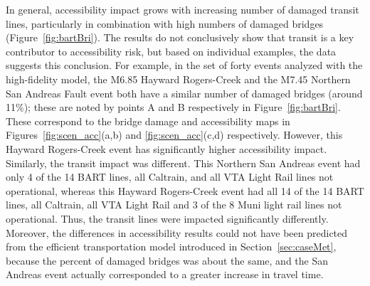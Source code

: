 In general, accessibility impact grows with increasing number of damaged transit lines, particularly in combination with high numbers of damaged bridges (Figure~\ref{fig:bartBri}). The results do not conclusively show that transit is a key contributor to accessibility risk, but based on individual examples, the data suggests this conclusion. For example, in the set of forty events analyzed with the high-fidelity model, the M6.85 Hayward Rogers-Creek and the M7.45 Northern San Andreas Fault event both have a similar number of damaged bridges (around 11\%); these are noted by points A and B respectively in Figure~\ref{fig:bartBri}. These correspond to the bridge damage and accessibility maps in Figures~\ref{fig:scen_acc}{(a,b)} and \ref{fig:scen_acc}{(c,d)} respectively.  However, this Hayward Rogers-Creek event has significantly higher accessibility impact. Similarly, the transit impact was different. This Northern San Andreas event had only 4 of the 14 BART lines, all Caltrain, and all VTA Light Rail lines not operational, whereas this Hayward Rogers-Creek event had all 14 of the 14 BART lines, all Caltrain, all VTA Light Rail and 3 of the 8 Muni light rail lines not operational. Thus, the transit lines were impacted significantly differently. Moreover, the differences in accessibility results could not have been predicted from the efficient transportation model introduced in Section~\ref{sec:caseMet}, because the percent of damaged bridges was about the same, and the San Andreas event actually corresponded to a greater increase in travel time.


